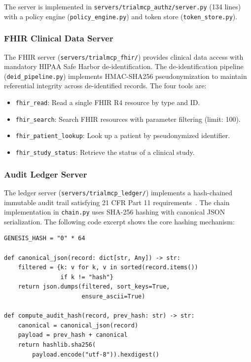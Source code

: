 The server is implemented in \texttt{servers/trialmcp\_authz/server.py} (134 lines) with a policy engine (\texttt{policy\_engine.py}) and token store (\texttt{token\_store.py}).

\subsubsection{FHIR Clinical Data Server}

The FHIR server (\texttt{servers/trialmcp\_fhir/}) provides clinical data access with mandatory HIPAA Safe Harbor de-identification. The de-identification pipeline (\texttt{deid\_pipeline.py}) implements HMAC-SHA256 pseudonymization to maintain referential integrity across de-identified records. The four tools are:

\begin{itemize}[leftmargin=*]
\item \texttt{fhir\_read}: Read a single FHIR R4 resource by type and ID.
\item \texttt{fhir\_search}: Search FHIR resources with parameter filtering (limit: 100).
\item \texttt{fhir\_patient\_lookup}: Look up a patient by pseudonymized identifier.
\item \texttt{fhir\_study\_status}: Retrieve the status of a clinical study.
\end{itemize}

\subsubsection{Audit Ledger Server}

The ledger server (\texttt{servers/trialmcp\_ledger/}) implements a hash-chained immutable audit trail satisfying 21 CFR Part 11 requirements~\cite{fda2003part11}. The chain implementation in \texttt{chain.py} uses SHA-256 hashing with canonical JSON serialization. The following code excerpt shows the core hashing mechanism:

\begin{lstlisting}[caption={Hash-chained audit record computation from \texttt{servers/trialmcp\_ledger/chain.py}.},label={lst:chain}]
GENESIS_HASH = "0" * 64

def canonical_json(record: dict[str, Any]) -> str:
    filtered = {k: v for k, v in sorted(record.items())
                if k != "hash"}
    return json.dumps(filtered, sort_keys=True,
                      ensure_ascii=True)

def compute_audit_hash(record, prev_hash: str) -> str:
    canonical = canonical_json(record)
    payload = prev_hash + canonical
    return hashlib.sha256(
        payload.encode("utf-8")).hexdigest()
\end{lstlisting}

